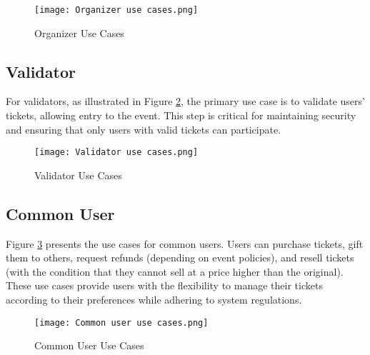 \begin{figure}[H]
    \centering
    \texttt{[image: Organizer use cases.png]}
    \caption{Organizer Use Cases}
    \label{fig:organizer_use_cases}
\end{figure}

\subsection{Validator}
\label{subsec:validator}

For validators, as illustrated in Figure \ref{fig:validator_use_cases}, the
primary use case is to validate users' tickets, allowing entry to the event.
This step is critical for maintaining security and ensuring that only users
with valid tickets can participate.

\begin{figure}[H]
    \centering
    \texttt{[image: Validator use cases.png]}
    \caption{Validator Use Cases}
    \label{fig:validator_use_cases}
\end{figure}

\subsection{Common User}
\label{subsec:common_user}

Figure \ref{fig:common_user_use_cases} presents the use cases for common users.
Users can purchase tickets, gift them to others, request refunds (depending on
event policies), and resell tickets (with the condition that they cannot sell
at a price higher than the original). These use cases provide users with the
flexibility to manage their tickets according to their preferences while
adhering to system regulations.

\begin{figure}[H]
    \centering
    \texttt{[image: Common user use cases.png]}
    \caption{Common User Use Cases}
    \label{fig:common_user_use_cases}
\end{figure}
